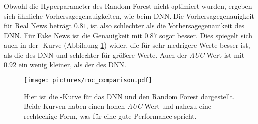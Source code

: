 Obwohl die Hyperparameter des Random Forest nicht optimiert wurden, ergeben sich ähnliche 
Vorhersagegenauigkeiten, wie beim DNN. Die Vorhersagegenauigkeit für Real News beträgt 
$0.81$, ist also schlechter als die Vorhersagegenauikeit des DNN. Für Fake 
News ist die Genauigkeit mit $0.87$ sogar besser. Dies spiegelt sich auch in der 
-Kurve (Abbildung \ref{fig:roc}) wider, die für sehr niedrigere Werte besser ist,
als die des DNN und schlechter für größere Werte. Auch der \textit{AUC}-Wert ist mit 
$0.92$ ein wenig kleiner, als der des DNN.

\begin{figure}
    \centering
    \texttt{[image: pictures/roc\_comparison.pdf]}
    \caption{Hier ist die -Kurve für das DNN und den Random Forest dargestellt.
    Beide Kurven haben einen hohen \textit{AUC}-Wert und nahezu eine rechteckige Form,
    was für eine gute Performance spricht.}
    \label{fig:roc}
\end{figure}



